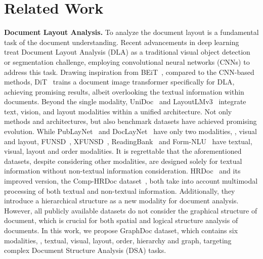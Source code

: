 \section{Related Work}
\noindent\textbf{Document Layout Analysis.} 
To analyze the document layout is a fundamental task of the document understanding. 
Recent advancements in deep learning~\citep{schreiber2017deepdesrt,prasad2020cascadetabnet} treat Document Layout Analysis (DLA) as a traditional visual object detection or segmentation challenge, employing convolutional neural networks (CNNs) to address this task.
Drawing inspiration from BEiT~\citep{bao2021beit}, compared to the CNN-based methods, DiT~\citep{li2022dit} trains a document image transformer specifically for DLA, achieving promising results, albeit overlooking the textual information within documents.
Beyond the single modality, UniDoc~\citep{gu2021unidoc} and LayoutLMv3~\citep{huang2022layoutlmv3} integrate text, vision, and layout modalities within a unified architecture.
Not only methods and architectures, but also benchmark datasets have achieved promising evolution. 
While PubLayNet~\citep{zhong2019publaynet} and DocLayNet~\citep{doclaynet2022} have only two modalities, \ie, visual and layout, FUNSD~\citep{jaume2019funsd}, XFUNSD~\citep{xu-etal-2022-xfund}, ReadingBank~\citep{wang2021layoutreader} and Form-NLU~\citep{ding2023form} have textual, visual, layout and order modalities. It is regrettable that the aforementioned datasets, despite considering other modalities, are designed solely for textual information without non-textual information consideration. HRDoc~\citep{Ma_Du_Hu_Zhang_Zhang_Zhu_Liu_2023} and its improved version, the Comp-HRDoc dataset~\citep{wang2024detect}, both take into account multimodal processing of both textual and non-textual information. Additionally, they introduce a hierarchical structure as a new modality for document analysis.
However, all publicly available datasets do not consider the graphical structure of document, which is crucial for both spatial and logical structure analysis of documents.
In this work, we propose GraphDoc dataset, which contains six modalities, \ie, textual, visual, layout, order, hierarchy and graph, targeting complex Document Structure Analysis (DSA) tasks. 


